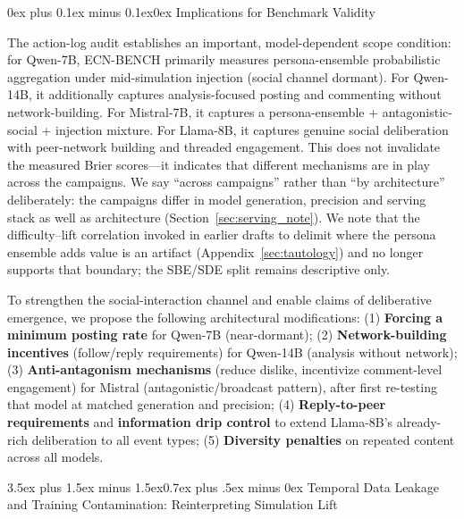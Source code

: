 \documentclass[11pt,journal,onecolumn]{IEEEtran}
\makeatletter
\renewcommand\subsection{\@startsection{subsection}{2}{\z@}%
  {3.5ex plus 1.5ex minus 1.5ex}{0.7ex plus .5ex minus 0ex}%
  {\normalfont\normalsize\bfseries}}
\renewcommand\subsubsection{\@startsection{subsubsection}{3}{\parindent}%
  {0ex plus 0.1ex minus 0.1ex}{0ex}%
  {\normalfont\normalsize\bfseries\itshape}}
\makeatother
\begin{document}
\subsubsection{Implications for Benchmark Validity}

The action-log audit establishes an important, model-dependent scope condition: for Qwen-7B, ECN-BENCH primarily measures persona-ensemble probabilistic aggregation under mid-simulation injection (social channel dormant). For Qwen-14B, it additionally captures analysis-focused posting and commenting without network-building. For Mistral-7B, it captures a persona-ensemble + antagonistic-social + injection mixture. For Llama-8B, it captures genuine social deliberation with peer-network building and threaded engagement. This does not invalidate the measured Brier scores---it indicates that different mechanisms are in play across the campaigns. We say ``across campaigns'' rather than ``by architecture'' deliberately: the campaigns differ in model generation, precision and serving stack as well as architecture (Section~\ref{sec:serving_note}). We note that the difficulty--lift correlation invoked in earlier drafts to delimit where the persona ensemble adds value is an artifact (Appendix~\ref{sec:tautology}) and no longer supports that boundary; the SBE/SDE split remains descriptive only.

To strengthen the social-interaction channel and enable claims of deliberative emergence, we propose the following architectural modifications: (1) \textbf{Forcing a minimum posting rate} for Qwen-7B (near-dormant); (2) \textbf{Network-building incentives} (follow/reply requirements) for Qwen-14B (analysis without network); (3) \textbf{Anti-antagonism mechanisms} (reduce dislike, incentivize comment-level engagement) for Mistral (antagonistic/\allowbreak broadcast pattern), after first re-testing that model at matched generation and precision; (4) \textbf{Reply-to-peer requirements} and \textbf{information drip control} to extend Llama-8B's already-rich deliberation to all event types; (5) \textbf{Diversity penalties} on repeated content across all models.

\subsection{Temporal Data Leakage and Training Contamination: Reinterpreting Simulation Lift}
\label{sec:contamination}
\end{document}
